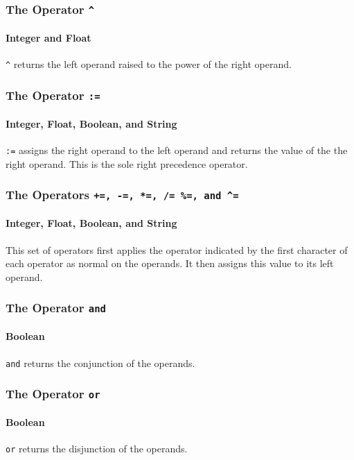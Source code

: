\subsubsection{The Operator {\tt \textasciicircum}}
\paragraph{Integer and Float}
\verb!^! returns the left operand raised to the power of the right operand.

\subsubsection{The Operator {\tt :=}}
\paragraph{Integer, Float, Boolean, and String}
\verb!:=! assigns the right operand to the left operand and returns the value of the the right operand. This is the sole right precedence operator.

\subsubsection{The Operators {\tt +=, -=, *=, /= \%=, and \textasciicircum=}}
\paragraph{Integer, Float, Boolean, and String}
This set of operators first applies the operator indicated by the first character of each operator as normal on the operands. It then assigns this value to its left operand.

\subsubsection{The Operator {\tt and}}
\paragraph{Boolean}
\verb!and! returns the conjunction of the operands.

\subsubsection{The Operator {\tt or}}
\paragraph{Boolean}
\verb!or! returns the disjunction of the operands.

